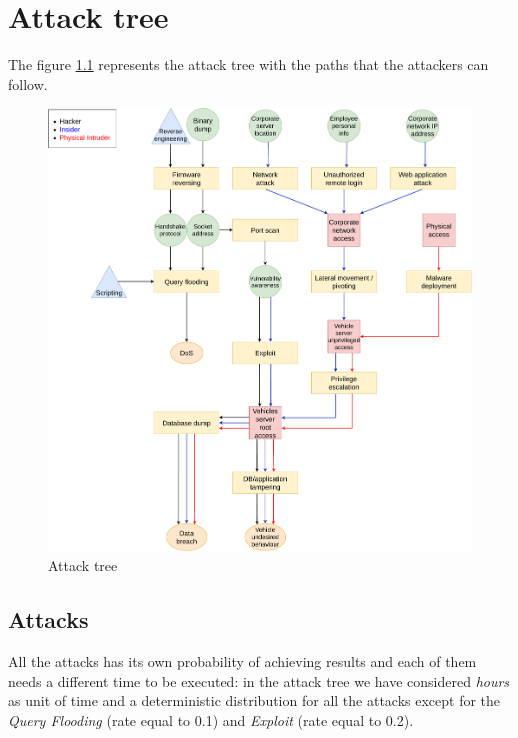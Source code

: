 %
\chapter{Attack tree}\label{ch:attackTree}

\noindent The figure \ref{fig:attackTree} represents the attack tree with the paths that the attackers can follow.

\begin{figure}[H]
    \begin{center}
        \includegraphics[scale=0.3]{img/attackTree.pdf}
        \caption{Attack tree}
        \label{fig:attackTree}
    \end{center}
    \vspace*{-0.4cm}
\end{figure}

\section{Attacks}
All the attacks has its own probability of achieving results and each of them needs a different time to be executed: in the attack tree we have considered \textit{hours} as unit of time and a deterministic distribution for all the attacks except for the \textit{Query Flooding} (rate equal to 0.1) and \textit{Exploit} (rate equal to 0.2).

